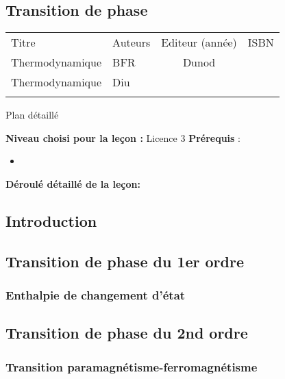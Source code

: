 \begin{headerBlock}
  \chapter{Transition de phase}
  \label{LP_TransitionPhase} 
\end{headerBlock}




\begin{center}
\begin{tabularx}{\textwidth}{| X | X | c | c |}
  \hline
  \rowcolor{gray!20}\multicolumn{4}{c}{Bibliographie de la leçon : } \\
  \hline 
  Titre & Auteurs & Editeur (année) & ISBN \\
  \hline
  Thermodynamique & BFR & Dunod & \\
  \hline 
  Thermodynamique & Diu &  &    \\
  \hline 
   &  & &    \\
  \hline 
\end{tabularx}
\end{center}


\begin{reportBlock}{Plan détaillé}

  \textbf{Niveau choisi pour la leçon :} Licence 3
  \newline
  \textbf{Prérequis} : \begin{itemize}
      \item 
  \end{itemize}

  \textbf{Déroulé détaillé de la leçon: }  
  
  \section*{Introduction}

  \section{Transition de phase du 1er ordre}
  \subsection{Enthalpie de changement d'état} 


  \section{Transition de phase du 2nd ordre}
\subsection{Transition paramagnétisme-ferromagnétisme}


\end{reportBlock}